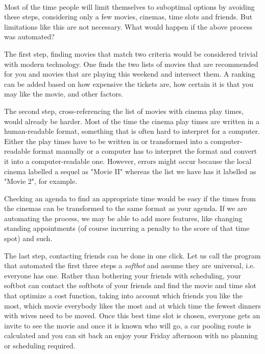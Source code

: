 \documentclass{article}
\begin{document}
 \paragraph{}
 Most of the time people will limit themselves to suboptimal options by avoiding these steps, considering only a few movies, cinemas, time slots and friends. But limitations like this are not necessary. What would happen if the above process was automated?
 
The first step, finding movies that match two criteria would be considered trivial with modern technology. One finds the two lists of movies that are recommended for you and movies that are playing this weekend and intersect them. A ranking can be added based on how expensive the tickets are, how certain it is that you may like the movie, and other factors. 

 The second step, cross-referencing the list of movies with cinema play times, would already be harder. Most of the time the cinema play times are written in a human-readable format, something that is often hard to interpret for a computer. Either the play times have to be written in or transformed into a computer-readable format manually or a computer has to interpret the format and convert it into a computer-readable one. However, errors might occur because the local cinema labelled a sequel as "Movie II" whereas the list we have has it labelled as "Movie 2", for example.
 
 Checking an agenda to find an appropriate time would be easy if the times from the cinemas can be transformed to the same format as your agenda. If we are automating the process, we may be able to add more features, like changing standing appointments (of course incurring a penalty to the score of that time spot) and such.
 
 The last step, contacting friends can be done in one click. Let us call the program that automated the first three steps a \emph{softbot} and assume they are universal, i.e. everyone has one. Rather than bothering your friends with scheduling, your softbot can contact the softbots of your friends and find the movie and time slot that optimize a cost function, taking into account which friends you like the most, which movie everybody likes the most and at which time the fewest dinners with wives need to be moved. Once this best time slot is chosen, everyone gets an invite to see the movie and once it is known who will go, a car pooling route is calculated and you can sit back an enjoy your Friday afternoon with no planning or scheduling required.
\end{document}
